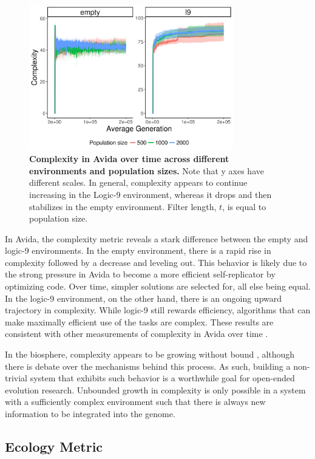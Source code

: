 \documentclass[letterpaper]{article}
\begin{document}
\begin{figure}
    \centering
    \includegraphics[width=3.5in]{figs/dolson.avida_env_complexity.png}
    \caption{\textbf{Complexity in Avida over time across different environments and population sizes.} Note that y axes have different scales. In general, complexity appears to continue increasing in the Logic-9 environment, whereas it drops and then stabilizes in the empty environment. Filter length, $t$, is equal to population size.    \label{fig:avida_env_complexity}}
\end{figure}

In Avida, the complexity metric reveals a stark difference between the empty and logic-9 environments. In the empty environment, there is a rapid rise in complexity followed by a decrease and leveling out. This behavior is likely due to the strong pressure in Avida to become a more efficient self-replicator by optimizing code. Over time, simpler solutions are selected for, all else being equal. In the logic-9 environment, on the other hand, there is an ongoing upward trajectory in complexity. While logic-9 still rewards efficiency, algorithms that can make maximally efficient use of the tasks are complex. These results are consistent with other measurements of complexity in Avida over time \citep{adami_evolution_2000}.

In the biosphere, complexity appears to be growing without bound \citep{korb_evolution_2011}, although there is debate over the mechanisms behind this process. As such, building a non-trivial system that exhibits such behavior is a worthwhile goal for open-ended evolution research. Unbounded growth in complexity is only possible in a system with a sufficiently complex environment such that there is always new information to be integrated into the genome.

\subsection{Ecology Metric}
\end{document}
